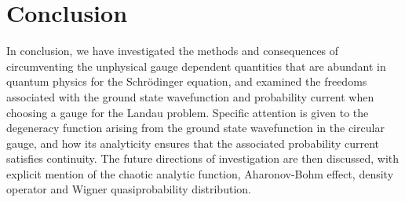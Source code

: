 \section{Conclusion}
\label{sec:conclusion}

In conclusion, we have investigated the methods and consequences of
circumventing the unphysical gauge dependent quantities that are abundant in
quantum physics for the Schr\"odinger equation, and examined the freedoms
associated with the ground state wavefunction and probability current when
choosing a gauge for the Landau problem. Specific attention is given to the
degeneracy function arising from the ground state wavefunction in the circular
gauge, and how its analyticity ensures that the associated probability current
satisfies continuity. The future directions of investigation are then discussed,
with explicit mention of the chaotic analytic function, Aharonov-Bohm effect,
density operator and Wigner quasiprobability distribution.
